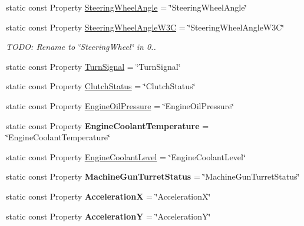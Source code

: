 \begin{DoxyCompactItemize}
\item 
static const Property \hyperlink{classVehicleProperty_aba4832663e4f850acbcf09c7cfbc6959}{Steering\+Wheel\+Angle} = \char`\"{}Steering\+Wheel\+Angle\char`\"{}
\item 
static const Property \hyperlink{classVehicleProperty_afb3708166c9863053de47a7dfcd0a09e}{Steering\+Wheel\+Angle\+W3\+C} = \char`\"{}Steering\+Wheel\+Angle\+W3\+C\char`\"{}
\begin{DoxyCompactList}\small\item\em T\+O\+D\+O\+: Rename to \char`\"{}\+Steering\+Wheel\char`\"{} in 0.. \end{DoxyCompactList}\item 
static const Property \hyperlink{classVehicleProperty_a0aae609c370a46a92dc52a31d2cc0310}{Turn\+Signal} = \char`\"{}Turn\+Signal\char`\"{}
\item 
static const Property \hyperlink{classVehicleProperty_acdca2ca718fd392c7ad9b8adc817baec}{Clutch\+Status} = \char`\"{}Clutch\+Status\char`\"{}
\item 
static const Property \hyperlink{classVehicleProperty_ab7fad273c7149dbd338f53f2536aca26}{Engine\+Oil\+Pressure} = \char`\"{}Engine\+Oil\+Pressure\char`\"{}
\item 
\hypertarget{classVehicleProperty_ae4f240ad9cecbbb9d0cb3a615865b60a}{static const Property {\bfseries Engine\+Coolant\+Temperature} = \char`\"{}Engine\+Coolant\+Temperature\char`\"{}}\label{classVehicleProperty_ae4f240ad9cecbbb9d0cb3a615865b60a}

\item 
static const Property \hyperlink{classVehicleProperty_aac38e43b1c1ec7239252dfafe6d19d87}{Engine\+Coolant\+Level} = \char`\"{}Engine\+Coolant\+Level\char`\"{}
\item 
\hypertarget{classVehicleProperty_a8b9faaa1094c2d162ed171a3063b7ffc}{static const Property {\bfseries Machine\+Gun\+Turret\+Status} = \char`\"{}Machine\+Gun\+Turret\+Status\char`\"{}}\label{classVehicleProperty_a8b9faaa1094c2d162ed171a3063b7ffc}

\item 
\hypertarget{classVehicleProperty_a94eac12d319850190e9ece93690517f7}{static const Property {\bfseries Acceleration\+X} = \char`\"{}Acceleration\+X\char`\"{}}\label{classVehicleProperty_a94eac12d319850190e9ece93690517f7}

\item 
\hypertarget{classVehicleProperty_af56803eeb7710aeae2954f4cd9b66cf6}{static const Property {\bfseries Acceleration\+Y} = \char`\"{}Acceleration\+Y\char`\"{}}\label{classVehicleProperty_af56803eeb7710aeae2954f4cd9b66cf6}


\end{DoxyCompactItemize}

